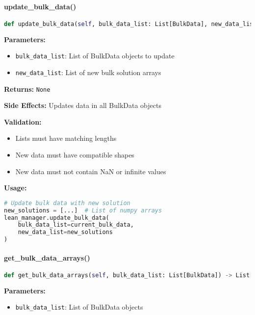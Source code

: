 \paragraph{update\_bulk\_data()}\leavevmode
\begin{lstlisting}[language=Python, caption=Update BulkData Method]
def update_bulk_data(self, bulk_data_list: List[BulkData], new_data_list: List[np.ndarray])
\end{lstlisting}

\textbf{Parameters:}
\begin{itemize}
    \item \texttt{bulk\_data\_list}: List of BulkData objects to update
    \item \texttt{new\_data\_list}: List of new bulk solution arrays
\end{itemize}

\textbf{Returns:} \texttt{None}

\textbf{Side Effects:} Updates data in all BulkData objects

\textbf{Validation:}
\begin{itemize}
    \item Lists must have matching lengths
    \item New data must have compatible shapes
    \item New data must not contain NaN or infinite values
\end{itemize}

\textbf{Usage:}
\begin{lstlisting}[language=Python, caption=Update BulkData Usage]
# Update bulk data with new solution
new_solutions = [...]  # List of numpy arrays
lean_manager.update_bulk_data(
    bulk_data_list=current_bulk_data,
    new_data_list=new_solutions
)
\end{lstlisting}

\paragraph{get\_bulk\_data\_arrays()}\leavevmode
\begin{lstlisting}[language=Python, caption=Get Data Arrays Method]
def get_bulk_data_arrays(self, bulk_data_list: List[BulkData]) -> List[np.ndarray]
\end{lstlisting}

\textbf{Parameters:}
\begin{itemize}
    \item \texttt{bulk\_data\_list}: List of BulkData objects
\end{itemize}

